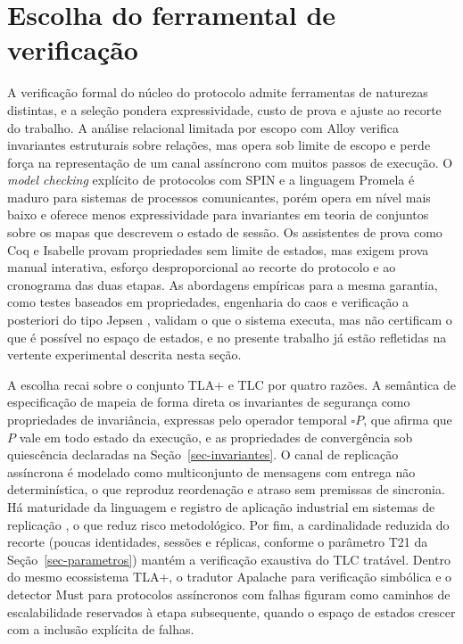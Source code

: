 \section*{Escolha do ferramental de verificação}
\label{sec-escolha-ferramenta}

A verificação formal do núcleo do protocolo admite ferramentas de naturezas distintas, e a seleção pondera expressividade, custo de prova e ajuste ao recorte do trabalho. A análise relacional limitada por escopo com Alloy \citep{jackson_software_abstractions_2012} verifica invariantes estruturais sobre relações, mas opera sob limite de escopo e perde força na representação de um canal assíncrono com muitos passos de execução. O \emph{model checking} explícito de protocolos com SPIN e a linguagem Promela \citep{holzmann_spin_2004} é maduro para sistemas de processos comunicantes, porém opera em nível mais baixo e oferece menos expressividade para invariantes em teoria de conjuntos sobre os mapas que descrevem o estado de sessão. Os assistentes de prova como Coq e Isabelle provam propriedades sem limite de estados, mas exigem prova manual interativa, esforço desproporcional ao recorte do protocolo e ao cronograma das duas etapas. As abordagens empíricas para a mesma garantia, como testes baseados em propriedades, engenharia do caos e verificação a posteriori do tipo Jepsen \citep{bailis_kingsbury_network_2014}, validam o que o sistema executa, mas não certificam o que é possível no espaço de estados, e no presente trabalho já estão refletidas na vertente experimental descrita nesta seção.

A escolha recai sobre o conjunto TLA+ e TLC por quatro razões. A semântica de especificação de \citet{lamport_specifying_systems_2002} mapeia de forma direta os invariantes de segurança como propriedades de invariância, expressas pelo operador temporal $\square P$, que afirma que $P$ vale em todo estado da execução, e as propriedades de convergência sob quiescência declaradas na Seção~\ref{sec-invariantes}. O canal de replicação assíncrona é modelado como multiconjunto de mensagens com entrega não determinística, o que reproduz reordenação e atraso sem premissas de sincronia.  Há maturidade da linguagem e registro de aplicação industrial em sistemas de replicação \citep{newcombe_aws_formal_methods_2015, newcombe_aws_tla_2014}, o que reduz risco metodológico. Por fim, a cardinalidade reduzida do recorte (poucas identidades, sessões e réplicas, conforme o parâmetro T21 da Seção~\ref{sec-parametros}) mantém a verificação exaustiva do TLC tratável.  Dentro do mesmo ecossistema TLA+, o tradutor Apalache para verificação simbólica e o detector Must \citep{enea_must_2024} para protocolos assíncronos com falhas figuram como caminhos de escalabilidade reservados à etapa subsequente, quando o espaço de estados crescer com a inclusão explícita de falhas. 

